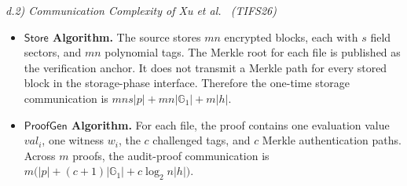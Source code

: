 \documentclass[lettersize,journal]{IEEEtran}
\newcommand{\GG}{\mathbb{G}}
\newcommand{\Store}{\mathsf{Store}}
\newcommand{\ProofGen}{\mathsf{ProofGen}}
\begin{document}
\noindent\textit{d.2) Communication Complexity of Xu et al.~\cite{XuTIFS26} (TIFS26)}
\begin{itemize}
\item \textbf{$\Store$ Algorithm.}  The source stores \(mn\) encrypted blocks, each with \(s\) field sectors, and \(mn\) polynomial tags. The Merkle root for each file is published as the verification anchor. It does not transmit a Merkle path for every stored block in the storage-phase interface. Therefore the one-time storage communication is \(mns|p|+mn|\GG_1|+m|h|\).
\item \textbf{$\ProofGen$ Algorithm.}  For each file, the proof contains one evaluation value \(val_i\), one witness \(w_i\), the \(c\) challenged tags, and \(c\) Merkle authentication paths. Across \(m\) proofs, the audit-proof communication is \(m\bigl(|p|+(c+1)|\GG_1|+c\log_2 n|h|\bigr)\).
\end{itemize}

\vfill
\end{document}
